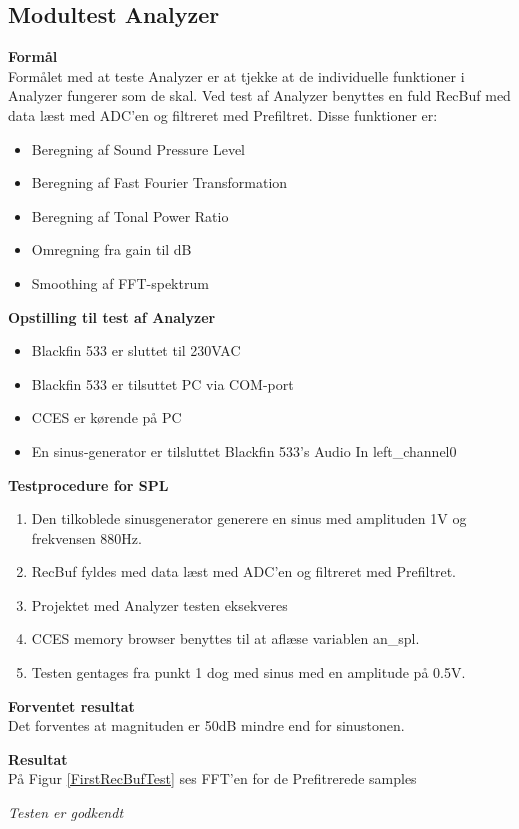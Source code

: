 \subsection{Modultest Analyzer}

\textbf{Formål} \\
Formålet med at teste Analyzer er at tjekke at de individuelle funktioner i Analyzer fungerer som de skal. Ved test af Analyzer benyttes en fuld RecBuf med data læst med ADC'en og filtreret med Prefiltret. 
Disse funktioner er:
\begin{itemize}
	\item Beregning af Sound Pressure Level
	\item Beregning af Fast Fourier Transformation
	\item Beregning af Tonal Power Ratio
	\item Omregning fra gain til dB
	\item Smoothing af FFT-spektrum
\end{itemize}

\textbf{Opstilling til test af Analyzer}

\begin{itemize}
	\item Blackfin 533 er sluttet til 230VAC
	\item Blackfin 533 er tilsuttet PC via COM-port
	\item CCES er kørende på PC
	\item En sinus-generator er tilsluttet Blackfin 533's Audio In left\_channel0
\end{itemize}

\textbf{Testprocedure for SPL}
\begin{enumerate}
	\item Den tilkoblede sinusgenerator generere en sinus med amplituden 1V og frekvensen 880Hz.	
	\item RecBuf fyldes med data læst med ADC'en og filtreret med Prefiltret.
	\item Projektet med Analyzer testen eksekveres 
	\item CCES memory browser benyttes til at aflæse variablen an\_spl. 
	\item Testen gentages fra punkt 1 dog med sinus med en amplitude på 0.5V.
\end{enumerate}

\textbf{Forventet resultat} \\
Det forventes at magnituden er 50dB mindre end for sinustonen. 


\textbf{Resultat} \\


På Figur \ref{FirstRecBufTest} ses FFT'en for de Prefitrerede samples 





\textit{Testen er godkendt}





